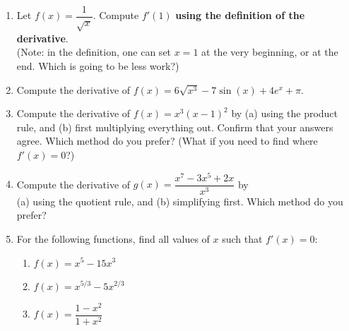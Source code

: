 \documentclass[12pt]{article}
\begin{document}
  \begin{enumerate}
    \item Let $f(x) = \dfrac{1}{\sqrt{x}}$. Compute $f'(1)$ \textbf{using the definition of the derivative}.\\
    (Note: in the definition, one can set $x=1$ at the very beginning, or at the end. Which is going to be less work?)
    
    \vspace{3in}
    
    \item Compute the derivative of $f(x) = 6\sqrt{x^3}-7\sin(x)+4e^x +\pi.$
    
    \vspace{1in}
    
    \item Compute the derivative of $f(x)=x^3(x-1)^2$ by (a) using the product rule, and (b) first multiplying everything out. Confirm that your answers agree. Which method do you prefer? (What if you need to find where $f'(x)=0$?)
    
   \newpage
    
    \item Compute the derivative of $g(x) = \dfrac{x^7-3x^5+2x}{x^3}$ by\\ (a) using the quotient rule, and (b) simplifying first. Which method do you prefer?
    
\vspace{2.5in}
    
    \item For the following functions, find all values of $x$ such that $f'(x)=0$:
    \begin{enumerate}
    \item $f(x) = x^5-15x^3$
    
    \vspace{1.75in}
    
    \item $f(x) = x^{5/3}-5x^{2/3}$
    
    \vspace{1.75in}
    
    \item $f(x) = \dfrac{1-x^2}{1+x^2}$
    \end{enumerate}
    
    
  \end{enumerate}
\end{document}
